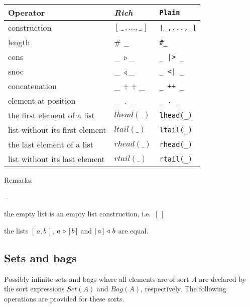 \documentclass[a4paper,fleqn]{article}
\newenvironment{tdefinitions}[2][0.15em]
  {\begin{list}%
    {#2}%
    {\setlength{\parsep}{0pt}%
     \setlength{\itemsep}{#1}%
     \setlength{\leftmargin}{\mathindent}%
     \setlength{\labelwidth}{\mathindent - \labelsep}%
    }
  }
  {\end{list}}
\newcommand{\frm}[1]{\mbox{\ensuremath{#1}}}
\newcommand{\f}[1]{\ensuremath{\mathit{#1}}}
\newcommand{\fa}[2]{\ensuremath{\f{#1}(#2)}}
\newcommand{\lst}[1]{\ensuremath{[\,#1\,]}}
\newcommand{\el}{\ensuremath{[\,]}}
\newcommand{\cons}{\ensuremath{\hspace{0.12em}\triangleright\hspace{0.08em}}}
\newcommand{\snoc}{\ensuremath{\hspace{0.08em}\triangleleft\hspace{0.12em}}}
\newcommand{\concat}{\frm{+\!+}}
\newlength{\tlength}
\begin{document}
\bigskip
\begin{tabular}{|l@{\qquad}L@{\qquad}l|}
\hline
Operator                       & \textit{Rich}          & \verb+Plain+\\\hline
construction                   & \lst{\_\,,\ldots,\_}   & \verb+[_,...,_]+\\
length                         & \# \_                  & \verb+#_+\\
cons                           & \_ \cons \_            & \verb+_ |> _+\\
snoc                           & \_ \snoc \_            & \verb+_ <| _+\\
concatenation                  & \_ \concat \_          & \verb-_ ++ _-\\
element at position            & \_\ .\ \_                & \verb+_ . _+\\
the first element of a list    & \fa{lhead}{\_}         & \verb+lhead(_)+\\
list without its first element & \fa{ltail}{\_}         & \verb+ltail(_)+\\
the last element of a list     & \fa{rhead}{\_}         & \verb+rhead(_)+\\
list without its last element  & \fa{rtail}{\_}         & \verb+rtail(_)+\\
\hline
\end{tabular}\bigskip

\noindent
Remarks:
\begin{tdefinitions}{-}
\item the empty list is an empty list construction, i.e.\ \frm{\el}
\item the lists \frm{\lst{a,b}}, \frm{a \cons \lst{b}} and \frm{\lst{a} \snoc b} are equal.
\end{tdefinitions}

\subsection{Sets and bags}

Possibly infinite sets and bags where all elements are of sort \frm{A} are declared by the sort expressions \frm{\fa{Set}{A}} and \frm{\fa{Bag}{A}}, respectively. The following operations are provided for these sorts.
\end{document}
